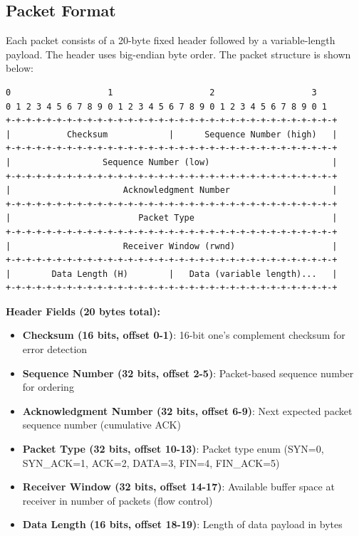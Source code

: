 \documentclass[11pt,a4paper]{article}
\begin{document}
\subsection{Packet Format}

Each packet consists of a 20-byte fixed header followed by a variable-length payload. The header uses big-endian byte order. The packet structure is shown below:

\begin{verbatim}
0                   1                   2                   3
0 1 2 3 4 5 6 7 8 9 0 1 2 3 4 5 6 7 8 9 0 1 2 3 4 5 6 7 8 9 0 1
+-+-+-+-+-+-+-+-+-+-+-+-+-+-+-+-+-+-+-+-+-+-+-+-+-+-+-+-+-+-+-+-+
|           Checksum            |      Sequence Number (high)   |
+-+-+-+-+-+-+-+-+-+-+-+-+-+-+-+-+-+-+-+-+-+-+-+-+-+-+-+-+-+-+-+-+
|                  Sequence Number (low)                        |
+-+-+-+-+-+-+-+-+-+-+-+-+-+-+-+-+-+-+-+-+-+-+-+-+-+-+-+-+-+-+-+-+
|                      Acknowledgment Number                    |
+-+-+-+-+-+-+-+-+-+-+-+-+-+-+-+-+-+-+-+-+-+-+-+-+-+-+-+-+-+-+-+-+
|                         Packet Type                           |
+-+-+-+-+-+-+-+-+-+-+-+-+-+-+-+-+-+-+-+-+-+-+-+-+-+-+-+-+-+-+-+-+
|                      Receiver Window (rwnd)                   |
+-+-+-+-+-+-+-+-+-+-+-+-+-+-+-+-+-+-+-+-+-+-+-+-+-+-+-+-+-+-+-+-+
|        Data Length (H)        |   Data (variable length)...   |
+-+-+-+-+-+-+-+-+-+-+-+-+-+-+-+-+-+-+-+-+-+-+-+-+-+-+-+-+-+-+-+-+
\end{verbatim}

\textbf{Header Fields (20 bytes total):}
\begin{itemize}
    \item \textbf{Checksum (16 bits, offset 0-1)}: 16-bit one's complement checksum for error detection
    \item \textbf{Sequence Number (32 bits, offset 2-5)}: Packet-based sequence number for ordering
    \item \textbf{Acknowledgment Number (32 bits, offset 6-9)}: Next expected packet sequence number (cumulative ACK)
    \item \textbf{Packet Type (32 bits, offset 10-13)}: Packet type enum (SYN=0, SYN\_ACK=1, ACK=2, DATA=3, FIN=4, FIN\_ACK=5)
    \item \textbf{Receiver Window (32 bits, offset 14-17)}: Available buffer space at receiver in number of packets (flow control)
    \item \textbf{Data Length (16 bits, offset 18-19)}: Length of data payload in bytes
\end{itemize}
\end{document}
